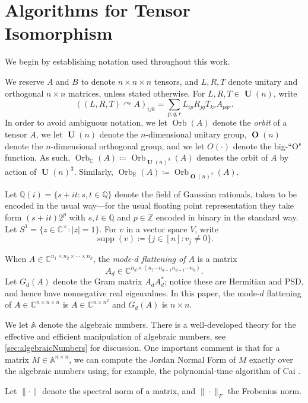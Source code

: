 \documentclass[11pt]{article}
\numberwithin{equation}{section}
\theoremstyle{remark}
\DeclareMathOperator{\Orth}{\textbf{O}}
\DeclareMathOperator{\Orb}{Orb}
\DeclareMathOperator{\Unitary}{\textbf{U}}
\DeclareMathOperator{\supp}{supp}
\renewcommand{\AA}{\mathbb{A}}
\newcommand{\CC}{\mathbb{C}}
\newcommand{\QQ}{\mathbb{Q}}
\newcommand{\RR}{\mathbb{R}}
\newcommand{\ZZ}{\mathbb{Z}}
\begin{document}
\section{Algorithms for Tensor Isomorphism}\label{sec:unitaryIso}

We begin by establishing notation used throughout this work.

We reserve $A$ and $B$ to denote $n\times n \times n$ tensors, and $L, R, T$ denote unitary and orthogonal $n\times n$ matrices, unless stated otherwise.
For $L, R, T \in \Unitary(n)$, write
\[
\left((L,R,T)\curvearrowright A\right)_{ijk} = \sum_{p,q,r}L_{ip}R_{jq}T_{kr}A_{pqr}.
\]
In order to avoid ambiguous notation, we let $\Orb(A)$ denote the \emph{orbit} of a tensor $A$, we let $\Unitary(n)$ denote the $n$-dimensional unitary group, $\Orth(n)$ denote the $n$-dimensional orthogonal group, and we let $O(\cdot)$ denote the big-``O" function. As such, $\Orb_\CC(A) \coloneqq \Orb_{\Unitary(n)^3}(A)$ denotes the orbit of $A$ by action of $\Unitary(n)^3$. Similarly, $\Orb_\RR(A) \coloneqq \Orb_{\Orth(n)^3}(A)$.

Let $\QQ(i) = \{s + it : s, t \in \QQ\}$ denote the field of Gaussian rationals, taken to be encoded in the usual way---for the usual floating point representation they take form $(s+it)2^p$ with $s, t \in \QQ$ and $p \in \ZZ$ encoded in binary in the standard way. Let $S^1 = \{z \in \CC^\times : |z|=1\}$. For $v$ in a vector space $V$, write
\[
\supp(v) \coloneqq \{j \in [n]: v_j \neq 0\}.
\]

When $A \in \CC^{n_1\times n_2\times \cdots \times n_k}$, the \emph{mode-$d$ flattening of $A$} is a matrix
\[
A_{d} \in \CC^{n_d\times (n_1\cdots n_{d-1}n_{d+1}\cdots n_k)}.
\]
Let $G_d(A)$ denote the Gram matrix $A_{d}A_{d}^*$; notice these are Hermitian and PSD, and hence have nonnegative real eigenvalues.
In this paper, the mode-$d$ flattening of $A \in \CC^{n\times n \times n}$ is $A \in \CC^{n \times n^2}$ and $G_d(A)$ is $n \times n$.

We let $\AA$ denote the algebraic numbers. There is a well-developed theory for the effective and efficient manipulation of algebraic numbers, see \cref{sec:algebraicNumbers} for discussion. One important comment is that for a matrix $M \in \AA^{n\times n}$, we can compute the Jordan Normal Form of $M$ exactly over the algebraic numbers using, for example, the polynomial-time algorithm of Cai \cite{cai1994computing}.

Let $\| \cdot \|$ denote the spectral norm of a matrix, and $\| \cdot \|_F$ the Frobenius norm.
\end{document}
